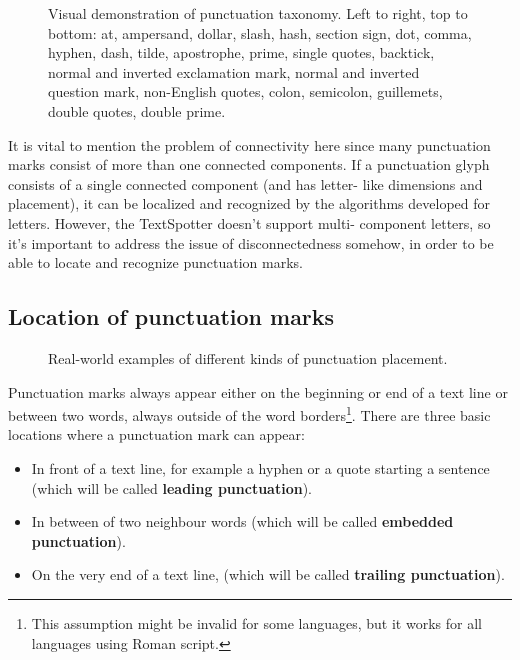 \documentclass[12pt,a4paper]{report}
\begin{document}
\begin{figure}[htbp]
    \centering
    \caption{Visual demonstration of punctuation taxonomy. Left to right, top to bottom: at, ampersand, dollar, slash, hash, section sign, dot, comma, hyphen, dash, tilde, apostrophe, prime, single quotes, backtick, normal and inverted exclamation mark, normal and inverted question mark, non-English quotes, colon, semicolon, guillemets, double quotes, double prime.}
    \label{fig:punctuation-taxonomy}
\end{figure}

It is vital to mention the problem of connectivity here since many punctuation marks consist of more than one connected components. If a punctuation glyph consists of a single connected component (and has letter- like dimensions and placement), it can be localized and recognized by the algorithms developed for letters. However, the TextSpotter doesn't support multi- component letters, so it's important to address the issue of disconnectedness somehow, in order to be able to locate and recognize punctuation marks.

\subsection{Location of punctuation marks}
\begin{figure}[htbp]
    \centering
    \caption{Real-world examples of different kinds of punctuation placement.}
    \label{fig:punctuation-placement}
\end{figure}

Punctuation marks always appear either on the beginning or end of a text line or between two words, always outside of the word borders\footnote{This assumption might be invalid for some languages, but it works for all languages using Roman script.}. There are three basic locations where a punctuation mark can appear:
\begin{itemize}
    \item In front of a text line, for example a hyphen or a quote starting a sentence (which will be called \textbf{leading punctuation}).
    \item In between of two neighbour words (which will be called \textbf{embedded punctuation}).
    \item On the very end of a text line, (which will be called \textbf{trailing punctuation}).
\end{itemize}
\end{document}
